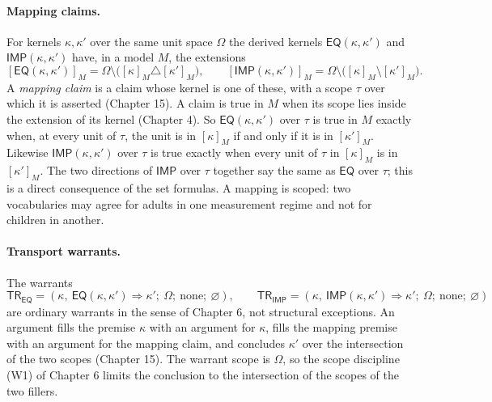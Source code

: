 \documentclass[11pt]{article}
\newcommand{\Om}{\Omega}
\newcommand{\EQ}{\mathsf{EQ}}
\newcommand{\IMP}{\mathsf{IMP}}
\newcommand{\TR}{\mathsf{TR}}
\newcommand{\ext}[2]{[#1]_{#2}}
\begin{document}
\paragraph{Mapping claims.} For kernels $\kappa,\kappa'$ over the same unit space $\Om$ the derived kernels $\EQ(\kappa,\kappa')$ and $\IMP(\kappa,\kappa')$ have, in a model $M$, the extensions
\[
\ext{\EQ(\kappa,\kappa')}{M}=\Om\setminus\bigl(\ext{\kappa}{M}\triangle\ext{\kappa'}{M}\bigr),\qquad
\ext{\IMP(\kappa,\kappa')}{M}=\Om\setminus\bigl(\ext{\kappa}{M}\setminus\ext{\kappa'}{M}\bigr).
\]
A \emph{mapping claim} is a claim whose kernel is one of these, with a scope $\tau$ over which it is asserted (Chapter 15). A claim is true in $M$ when its scope lies inside the extension of its kernel (Chapter 4). So $\EQ(\kappa,\kappa')$ over $\tau$ is true in $M$ exactly when, at every unit of $\tau$, the unit is in $\ext{\kappa}{M}$ if and only if it is in $\ext{\kappa'}{M}$. Likewise $\IMP(\kappa,\kappa')$ over $\tau$ is true exactly when every unit of $\tau$ in $\ext{\kappa}{M}$ is in $\ext{\kappa'}{M}$. The two directions of $\IMP$ over $\tau$ together say the same as $\EQ$ over $\tau$; this is a direct consequence of the set formulas. A mapping is scoped: two vocabularies may agree for adults in one measurement regime and not for children in another.

\paragraph{Transport warrants.} The warrants
\[
\TR_{\EQ}=(\kappa,\ \EQ(\kappa,\kappa')\Rightarrow\kappa';\ \Om;\ \mathrm{none};\ \varnothing),\qquad
\TR_{\IMP}=(\kappa,\ \IMP(\kappa,\kappa')\Rightarrow\kappa';\ \Om;\ \mathrm{none};\ \varnothing)
\]
are ordinary warrants in the sense of Chapter 6, not structural exceptions. An argument fills the premise $\kappa$ with an argument for $\kappa$, fills the mapping premise with an argument for the mapping claim, and concludes $\kappa'$ over the intersection of the two scopes (Chapter 15). The warrant scope is $\Om$, so the scope discipline (W1) of Chapter 6 limits the conclusion to the intersection of the scopes of the two fillers.
\end{document}
